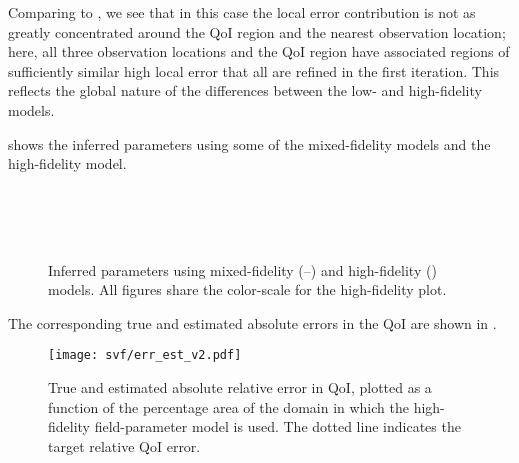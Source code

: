 %
Comparing to , we see that in this case the local error contribution is not as greatly concentrated around the QoI region and the nearest observation location; here, all three observation locations and the QoI region have associated regions of sufficiently similar high local error that all are refined in the first iteration. This reflects the global nature of the differences between the low- and high-fidelity models. 

 shows the inferred parameters using some of the mixed-fidelity models and the high-fidelity model.
%
\begin{figure}[htbp]
\centering
{} \\
 \\
 \\
\caption{Inferred parameters using mixed-fidelity (\protect{}--\protect{}) and high-fidelity (\protect{}) models. All figures share the color-scale for the high-fidelity plot.}
\label{fig:svfRefParams}
\end{figure}
%
The corresponding true and estimated absolute errors in the QoI are shown in .
%
\begin{figure}[htbp]
\centering
\texttt{[image: svf/err\_est\_v2.pdf]}
\caption{True and estimated absolute relative error in QoI, plotted as a function of the percentage area of the domain in which the high-fidelity field-parameter model is used. The dotted line indicates the target relative QoI error.}
\label{fig:svfErr}
\end{figure}
%

